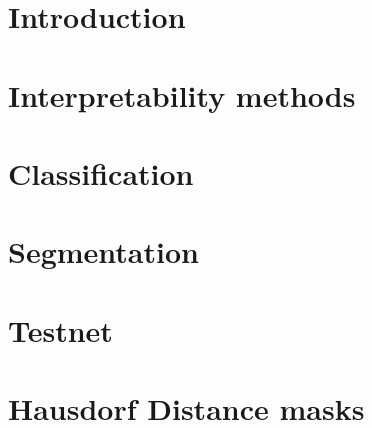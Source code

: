 \chapter{Introduction}


\chapter{Interpretability methods}








\chapter{Classification}







\chapter{Segmentation}









\chapter{Testnet}


\chapter{Hausdorf Distance masks}








